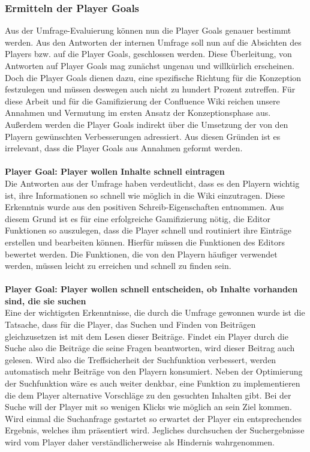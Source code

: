 \documentclass[a4paper,12pt,twoside]{scrartcl}
\begin{document}
\subsubsection{Ermitteln der Player Goals}
\label{Player}
Aus der Umfrage-Evaluierung können nun die Player Goals genauer bestimmt werden. Aus den Antworten der internen Umfrage soll nun auf die Absichten des Players bzw. auf die Player Goals, geschlossen werden. Diese Überleitung,
von Antworten auf Player Goals mag zunächst ungenau und willkürlich erscheinen. Doch die Player Goals dienen dazu, eine spezifische Richtung für die Konzeption festzulegen und müssen deswegen auch nicht zu hundert Prozent zutreffen. Für diese Arbeit und für die Gamifizierung der Confluence Wiki reichen unsere Annahmen und Vermutung im ersten Ansatz der Konzeptionsphase aus. Außerdem werden die Player Goals indirekt über die Umsetzung der von den Playern gewünschten Verbesserungen adressiert. Aus diesen Gründen ist es irrelevant, dass die Player Goals aus Annahmen geformt werden.
\\\\
\textbf{Player Goal: Player wollen Inhalte schnell eintragen}\\
Die Antworten aus der Umfrage haben verdeutlicht, dass es den Playern wichtig ist, ihre Informationen so schnell wie möglich in die Wiki einzutragen. Diese Erkenntnis wurde aus den positiven Schreib-Eigenschaften entnommen. Aus diesem Grund ist es für eine erfolgreiche Gamifizierung nötig, die Editor Funktionen so auszulegen, dass die Player schnell und routiniert ihre Einträge erstellen und bearbeiten können. Hierfür müssen die Funktionen des Editors bewertet werden. Die Funktionen, die von den Playern häufiger verwendet werden, müssen leicht zu erreichen und schnell zu finden sein.
\\\\
\textbf{Player Goal: Player wollen schnell entscheiden, ob Inhalte vorhanden sind, die sie suchen}\\
Eine der wichtigsten Erkenntnisse, die durch die Umfrage gewonnen wurde ist die Tatsache, dass für die Player, das Suchen und Finden von Beiträgen gleichzusetzen ist mit dem Lesen dieser Beiträge. Findet ein Player durch die Suche also die Beiträge die seine Fragen beantworten, wird dieser Beitrag auch gelesen. Wird also die Treffsicherheit der Suchfunktion verbessert, werden automatisch mehr Beiträge von den Playern konsumiert. Neben der Optimierung der Suchfunktion wäre es auch weiter denkbar, eine Funktion zu implementieren die dem Player alternative Vorschläge zu den gesuchten Inhalten gibt. Bei der Suche will der Player mit so wenigen Klicks wie möglich an sein Ziel kommen. Wird einmal die Suchanfrage gestartet so erwartet der Player ein entsprechendes Ergebnis, welches ihm präsentiert wird. Jegliches durchsuchen der Suchergebnisse wird vom Player daher verständlicherweise als Hindernis wahrgenommen.
\end{document}
